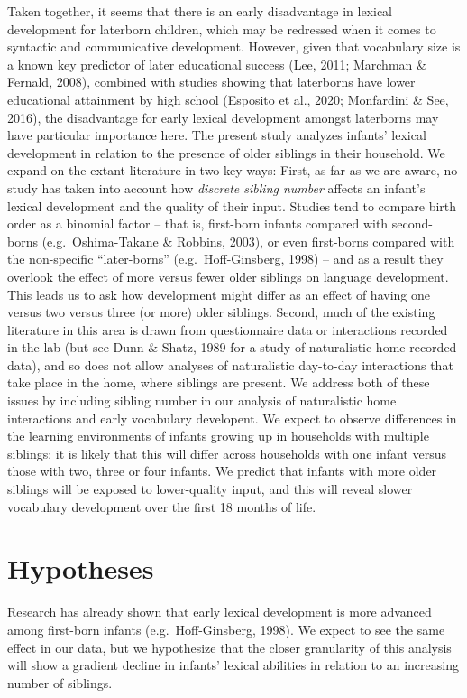 \documentclass[man,floatsintext]{apa6}
\begin{document}
Taken together, it seems that there is an early disadvantage in lexical development for laterborn children, which may be redressed when it comes to syntactic and communicative development. However, given that vocabulary size is a known key predictor of later educational success (Lee, 2011; Marchman \& Fernald, 2008), combined with studies showing that laterborns have lower educational attainment by high school (Esposito et al., 2020; Monfardini \& See, 2016), the disadvantage for early lexical development amongst laterborns may have particular importance here. The present study analyzes infants' lexical development in relation to the presence of older siblings in their household. We expand on the extant literature in two key ways: First, as far as we are aware, no study has taken into account how \emph{discrete sibling number} affects an infant's lexical development and the quality of their input. Studies tend to compare birth order as a binomial factor -- that is, first-born infants compared with second-borns (e.g.~Oshima-Takane \& Robbins, 2003), or even first-borns compared with the non-specific \enquote{later-borns} (e.g.~Hoff-Ginsberg, 1998) -- and as a result they overlook the effect of more versus fewer older siblings on language development. This leads us to ask how development might differ as an effect of having one versus two versus three (or more) older siblings. Second, much of the existing literature in this area is drawn from questionnaire data or interactions recorded in the lab (but see Dunn \& Shatz, 1989 for a study of naturalistic home-recorded data), and so does not allow analyses of naturalistic day-to-day interactions that take place in the home, where siblings are present. We address both of these issues by including sibling number in our analysis of naturalistic home interactions and early vocabulary developent. We expect to observe differences in the learning environments of infants growing up in households with multiple siblings; it is likely that this will differ across households with one infant versus those with two, three or four infants. We predict that infants with more older siblings will be exposed to lower-quality input, and this will reveal slower vocabulary development over the first 18 months of life.

\hypertarget{hypotheses}{%
\section{Hypotheses}\label{hypotheses}}

Research has already shown that early lexical development is more advanced among first-born infants (e.g.~Hoff-Ginsberg, 1998). We expect to see the same effect in our data, but we hypothesize that the closer granularity of this analysis will show a gradient decline in infants' lexical abilities in relation to an increasing number of siblings.
\end{document}
